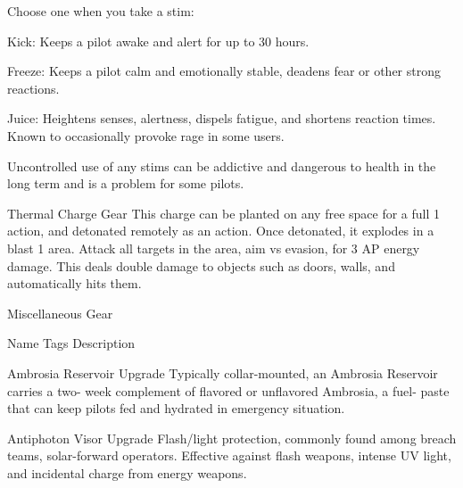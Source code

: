                                      Choose one when you take a stim:
 
                                     Kick: Keeps a pilot awake and alert for up to 30 hours. 
 
                                     Freeze: Keeps a pilot calm and emotionally stable,  
                                     deadens fear or other strong reactions.
 
                                     Juice: Heightens senses, alertness, dispels fatigue, and  
                                     shortens reaction times. Known to occasionally provoke  
                                     rage in some users.
 

                                     Uncontrolled use of any stims can be addictive and  
                                     dangerous to health in the long term and is a problem for  
                                     some pilots.  

  Thermal Charge          Gear       This charge can be planted on any free space for a full                1 
                                     action, and detonated remotely as an action. Once  
                                     detonated, it explodes in a blast 1 area. Attack all targets  
                                     in the area, aim vs evasion, for 3 AP energy damage. This  
                                     deals double damage to objects such as doors, walls, and  
                                     automatically hits them. 

                                                Miscellaneous Gear  

          Name                   Tags                                       Description 

Ambrosia Reservoir            Upgrade        Typically collar-mounted, an Ambrosia Reservoir carries a two- 
                                             week complement of flavored or unflavored Ambrosia, a fuel- 
                                             paste that can keep pilots fed and hydrated in emergency  
                                             situation.  

Antiphoton Visor              Upgrade        Flash/light protection, commonly found among breach teams,  
                                             solar-forward operators. Effective against flash weapons, intense  
                                             UV light, and incidental charge from energy weapons.  

